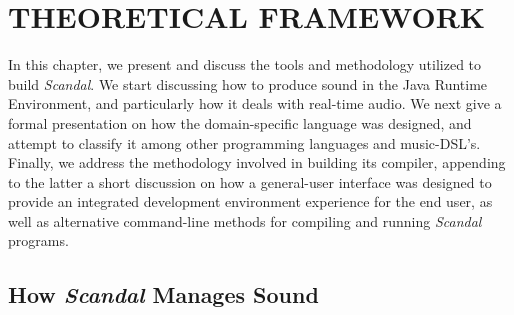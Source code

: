 \chapter{THEORETICAL FRAMEWORK}

In this chapter, we present and discuss the tools and methodology utilized to build \emph{Scandal}. We start discussing how to produce sound in the Java Runtime Environment, and particularly how it deals with real-time audio. We next give a formal presentation on how the domain-specific language was designed, and attempt to classify it among other programming languages and music-DSL's. Finally, we address the methodology involved in building its compiler, appending to the latter a short discussion on how a general-user interface was designed to provide an integrated development environment experience for the end user, as well as alternative command-line methods for compiling and running \emph{Scandal} programs.

\section{How \emph{Scandal} Manages Sound}

